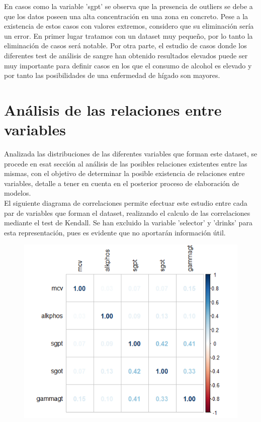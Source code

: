 




En casos como la variable 'sgpt' se observa que la presencia de outliers se debe a que los datos poseen una alta concentración en una zona en concreto. Pese a la existencia de estos casos con valores extremos, considero que su eliminación sería un error. En primer lugar tratamos con un dataset muy pequeño, por lo tanto la eliminación de casos será notable. Por otra parte, el estudio de casos donde los diferentes test de análisis de sangre han obtenido resultados elevados puede ser muy importante para definir casos en los que el consumo de alcohol es elevado y por tanto las posibilidades de una enfermedad de hígado son mayores.



\newpage
\section{Análisis de las relaciones entre variables}
Analizada las distribuciones de las diferentes variables que forman este dataset, se procede en esat sección al análisis de las posibles relaciones existentes entre las mismas, con el objetivo de determinar la posible existencia de relaciones entre variables, detalle a tener en cuenta en el posterior proceso de elaboración de modelos.\\

El siguiente diagrama de correlaciones permite efectuar este estudio entre cada par de variables que forman el dataset, realizando el calculo de las correlaciones mediante el test de Kendall. Se han excluido la variable 'selector' y 'drinks' para esta representación, pues es evidente que no aportarán información útil. 

\begin{figure}[!h]
	\centering
	\includegraphics[width=0.7\linewidth]{figures/corr_2}
	\caption{}
	\label{fig:corr2}
\end{figure}

